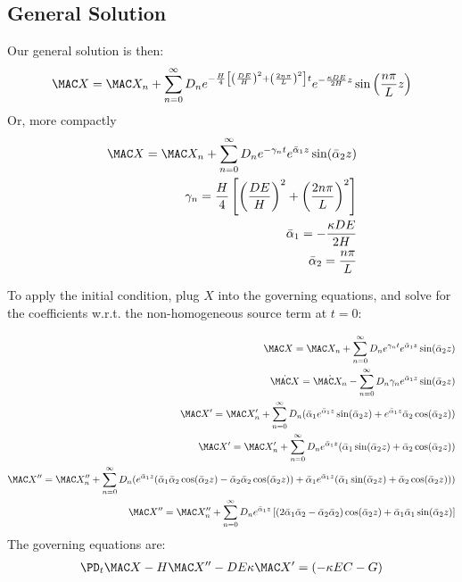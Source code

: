 \documentclass[11pt]{article}
\newcommand{\ABA}{\bar{\alpha}_1}
\newcommand{\ABB}{\bar{\alpha}_2}
\begin{document}
\subsection{General Solution}
Our general solution is then:
\begin{equation}\begin{aligned}
	\MAC X = \MAC X_n + \sum_{n=0}^{\infty} D_n e^{-\frac{H}{4} \left[ \left(\frac{DE}{H}\right)^2 + \left( \frac{2n\pi}{L} \right)^2  \right] t} e^{-\frac{\kappa DE}{2H} z} \sin\left(\frac{n\pi}{L} z \right) \\
\end{aligned} \end{equation}
Or, more compactly
\begin{equation}\begin{aligned}
	\MAC X = \MAC X_n + \sum_{n=0}^{\infty} D_n e^{-\gamma_n t} e^{\ABA z} \sin(\ABB z) \\
	\gamma_n = \frac{H}{4} \left[ \left(\frac{DE}{H}\right)^2 + \left( \frac{2n\pi}{L} \right)^2  \right] \\
	\ABA = -\frac{\kappa DE}{2H} \\
	\ABB = \frac{n\pi}{L} \\
\end{aligned} \end{equation}

To apply the initial condition, plug $X$ into the governing equations, and solve for the coefficients w.r.t. the non-homogeneous source term at $t=0$:

\begin{equation}\begin{aligned}
	\MAC X = \MAC X_n + \sum_{n=0}^{\infty} D_n e^{\gamma_n t} e^{\ABA z} \sin (\ABB z) \\
	\dot{\MAC X} = \dot{\MAC X_n} - \sum_{n=0}^{\infty} D_n \gamma_n e^{\ABA z} \sin(\ABB z) \\
	\MAC X' = \MAC X_n'   + \sum_{n=0}^{\infty} D_n ( \ABA e^{\ABA z} \sin (\ABB z) + e^{\ABA z} \ABB \cos (\ABB z) ) \\
	\MAC X' = \MAC X_n'   + \sum_{n=0}^{\infty} D_n e^{\ABA z} ( \ABA \sin (\ABB z) + \ABB \cos (\ABB z) ) \\
	\MAC X''= \MAC X_n''  + \sum_{n=0}^{\infty} D_n (e^{\ABA z} ( \ABA \ABB \cos (\ABB z) - \ABB \ABB \cos (\ABB z) ) +\ABA e^{\ABA z} ( \ABA \sin (\ABB z) + \ABB \cos (\ABB z) )) \\
	\MAC X''= \MAC X_n''  + \sum_{n=0}^{\infty} D_n e^{\ABA z} \left[ (2 \ABA \ABB - \ABB \ABB) \cos (\ABB z) + \ABA \ABA \sin (\ABB z) \right] \\
\end{aligned} \end{equation}
The governing equations are:
\begin{equation}\begin{aligned}
	\PD_t \MAC X - H \MAC X'' - DE \kappa \MAC X'  = (- \kappa EC -G) \\
\end{aligned} \end{equation}
\end{document}
